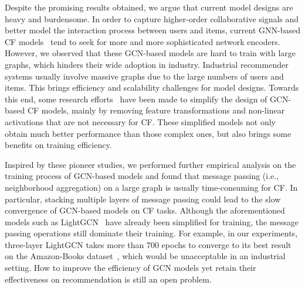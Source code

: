 \documentclass[sigconf,authorversion]{acmart}
\begin{document}
Despite the promising results obtained, we argue that current model designs are heavy and burdensome. In order to capture higher-order collaborative signals and better model the interaction process between users and items, current GNN-based CF models~\cite{GC-MC, NGCF, NIA-GCN, LCFN} tend to seek for more and more sophisticated network encoders. However, we observed that these GCN-based models are hard to train with large graphs, which hinders their wide adoption in industry. Industrial recommender systems usually involve massive graphs due to the large numbers of users and items. This brings efficiency and scalability challenges for model designs. Towards this end, some research efforts~\cite{LR-GCCF, LightGCN, RGCF} have been made to simplify the design of GCN-based CF models, mainly by removing feature transformations and non-linear activations that are not necessary for CF. These simplified models not only obtain much better performance than those complex ones, but also brings some benefits on training efficiency. 

Inspired by these pioneer studies, we performed further empirical analysis on the training process of GCN-based models and found that message passing (i.e., neighborhood aggregation) on a large graph is usually time-consuming for CF. In particular, stacking multiple layers of message passing could lead to the slow convergence of GCN-based models on CF tasks. Although the aforementioned models such as LightGCN~\cite{LightGCN} have already been simplified for training, the message passing operations still dominate their training. For example, in our experiments, three-layer LightGCN takes more than 700 epochs to converge to its best result on the Amazon-Books dataset~\cite{amazonbooks}, which would be unacceptable in an industrial setting. How to improve the efficiency of GCN models yet retain their effectiveness on recommendation is still an open problem.  
\end{document}
